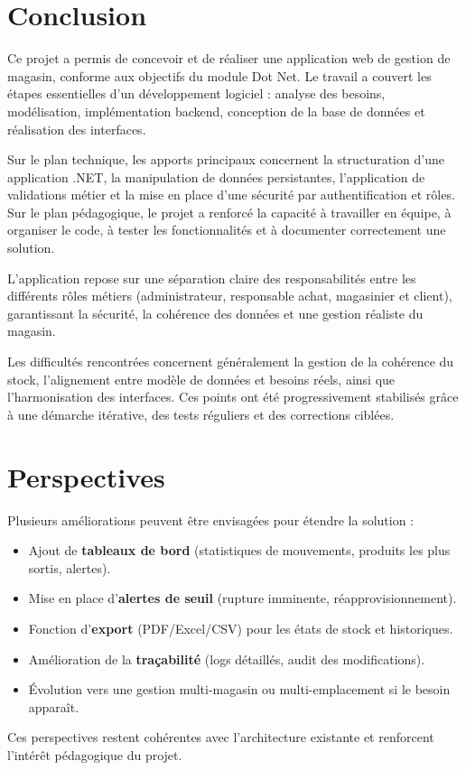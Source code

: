 \documentclass[12pt,a4paper]{report}
\begin{document}
\chapter*{Conclusion}

Ce projet a permis de concevoir et de réaliser une application web de gestion de magasin, conforme aux objectifs du module Dot Net. Le travail a couvert les étapes essentielles d’un développement logiciel : analyse des besoins, modélisation, implémentation backend, conception de la base de données et réalisation des interfaces.

Sur le plan technique, les apports principaux concernent la structuration d’une application .NET, la manipulation de données persistantes, l’application de validations métier et la mise en place d’une sécurité par authentification et rôles. Sur le plan pédagogique, le projet a renforcé la capacité à travailler en équipe, à organiser le code, à tester les fonctionnalités et à documenter correctement une solution.

L’application repose sur une séparation claire des responsabilités entre les différents rôles métiers (administrateur, responsable achat, magasinier et client), garantissant la sécurité, la cohérence des données et une gestion réaliste du magasin.

Les difficultés rencontrées concernent généralement la gestion de la cohérence du stock, l’alignement entre modèle de données et besoins réels, ainsi que l’harmonisation des interfaces. Ces points ont été progressivement stabilisés grâce à une démarche itérative, des tests réguliers et des corrections ciblées.

\chapter*{Perspectives}

Plusieurs améliorations peuvent être envisagées pour étendre la solution :
\begin{itemize}
    \item Ajout de \textbf{tableaux de bord} (statistiques de mouvements, produits les plus sortis, alertes).
    \item Mise en place d’\textbf{alertes de seuil} (rupture imminente, réapprovisionnement).
    \item Fonction d’\textbf{export} (PDF/Excel/CSV) pour les états de stock et historiques.
    \item Amélioration de la \textbf{traçabilité} (logs détaillés, audit des modifications).
    \item Évolution vers une gestion multi-magasin ou multi-emplacement si le besoin apparaît.
\end{itemize}
Ces perspectives restent cohérentes avec l’architecture existante et renforcent l’intérêt pédagogique du projet.
\end{document}
